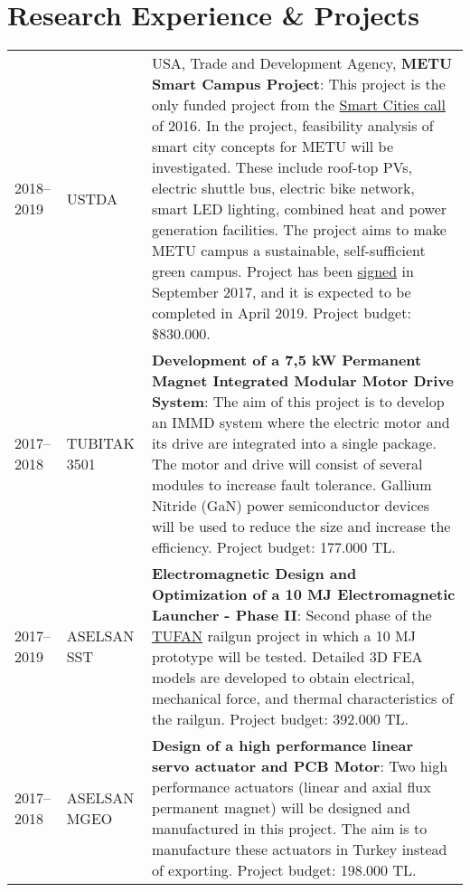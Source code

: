 \documentclass[a4paper,12pt]{article}
\begin{document}
\section{Research Experience \& Projects}
\begin{longtable}{lp{3cm}p{12cm}}
2018--2019 & USTDA & USA, Trade and Development Agency, \textbf{METU Smart Campus Project}: This project is the only funded project from the \href{https://docs.wixstatic.com/ugd/96b21c_3c398c840786434e9a3362c733396559.pdf}{Smart Cities call} of 2016. In the project, feasibility analysis of smart city concepts for METU will be investigated. These include roof-top PVs, electric shuttle bus, electric bike network, smart LED lighting, combined heat and power generation facilities. The project aims to make METU campus a sustainable, self-sufficient green campus. Project has been \href{https://www.ustda.gov/news/press-releases/2017/ustda-supports-metu-smart-campus-technical-assistance-grant}{signed} in September 2017, and it is expected to be completed in April 2019. Project budget: \$830.000. \\

2017--2018 & TUBITAK 3501 & \textbf{Development of a 7,5 kW Permanent Magnet Integrated Modular Motor Drive System}: The aim of this project is to develop an IMMD system where the electric motor and its drive are integrated into a single package. The motor and drive will consist of several modules to increase fault tolerance. Gallium Nitride (GaN) power semiconductor devices will be used to reduce the size and increase the efficiency. Project budget: 177.000 TL.\\

2017--2019 & ASELSAN SST & \textbf{Electromagnetic Design and Optimization of a 10 MJ Electromagnetic Launcher - Phase II}: Second phase of the \href{http://www.millisavunma.com/aselsan-tufan-elektromanyetik-top-sistemi/}{TUFAN} railgun project in which a 10 MJ prototype will be tested. Detailed 3D FEA models are developed to obtain electrical, mechanical force, and thermal characteristics of the railgun. Project budget: 392.000 TL.\\

2017--2018 & ASELSAN MGEO & \textbf{Design of a high performance linear servo actuator and PCB Motor}: Two high performance actuators (linear and axial flux permanent magnet) will be designed and manufactured in this project. The aim is to manufacture these actuators in Turkey instead of exporting. Project budget: 198.000 TL.\\


\end{longtable}
\end{document}
